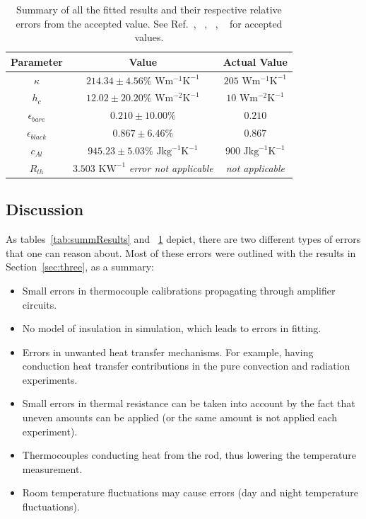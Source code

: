 \documentclass[10pt,aps,prb,twocolumn, nofootinbib]{revtex4-1}
\begin{document}
\begin{table}[hb]
    \caption{\label{tab:summResultsActual}Summary of all the fitted results and their respective relative errors from the accepted value. See Ref.~, ~, ~, ~ for accepted values.}
    \centering
    \begin{ruledtabular}
    \begin{tabular}{ccc}
    	Parameter & Value & Actual Value\\ \hline
        $\kappa$ & $214.34 \pm 4.56\% \text{ W}\text{m}^{-1}\text{K}^{-1}$ &$ 205\text{ W}\text{m}^{-1}\text{K}^{-1}$ \\
        $h_c$ & $12.02 \pm 20.20 \% \text{ W}\text{m}^{-2}\text{K}^{-1}$ & $10 \text{ W}\text{m}^{-2}\text{K}^{-1}$ \\
        $\epsilon_{bare}$ & $0.210 \pm 10.00\%$ & $0.210$  \\
        $\epsilon_{black}$ & $0.867 \pm 6.46\%$ &  $0.867$\\
        $c_{Al}$ & $945.23 \pm 5.03\% \text{ J}\text{kg}^{-1}\text{K}^{-1}$ & $900 \text{ J}\text{kg}^{-1}\text{K}^{-1}$\\
        $R_{th}$ & $3.503\text{ K}\text{W}^{-1} $ \textit{error not applicable} & \textit{not applicable}\\
    \end{tabular}
    \end{ruledtabular}
\end{table}
    
\subsection*{Discussion}
As tables~\ref{tab:summResults} and ~\ref{tab:summResultsActual} depict, there are two different types of errors that one can reason about. Most of these errors were outlined with the results in Section~\ref{sec:three}, as a summary:

\begin{footnotesize}
	\begin{itemize}\parskip0pt
    \item Small errors in thermocouple calibrations propagating through amplifier circuits.
    \item No model of insulation in simulation, which leads to errors in fitting.
    \item Errors in unwanted heat transfer mechanisms. For example, having conduction heat transfer contributions in the pure convection and radiation experiments.
    \item Small errors in thermal resistance can be taken into account by the fact that uneven amounts can be applied (or the same amount is not applied each experiment).
    \item Thermocouples conducting heat from the rod, thus lowering the temperature measurement.
    \item Room temperature fluctuations may cause errors (day and night temperature fluctuations).
    \end{itemize}
\end{footnotesize}
\end{document}
